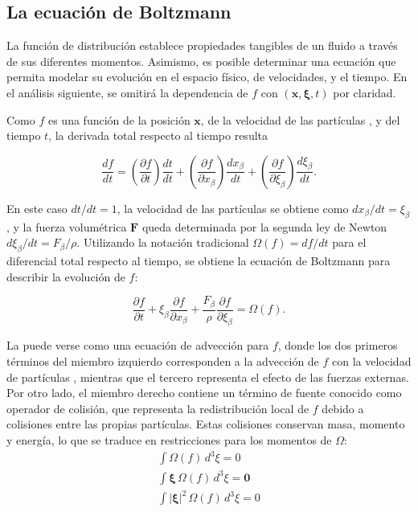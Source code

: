\subsection{La ecuaci\'on de Boltzmann}
La funci\'on de distribuci\'on \fvar{} establece propiedades tangibles de un fluido a trav\'es de sus diferentes momentos. Asimismo, es posible determinar una ecuaci\'on que permita modelar su evoluci\'on en el espacio f\'isico, de velocidades, y el tiempo. En el an\'alisis siguiente, se omitir\'a la dependencia de $f$ con $(\bm{x}, \bm{\xi}, t)$ por claridad.
\par
Como $f$ es una funci\'on de la posici\'on $\bm{x}$, de la velocidad de las part\'iculas \bxi{}, y del tiempo $t$, la derivada total respecto al tiempo resulta

\begin{equation}
	\dfrac{df}{dt} = \left( \dfrac{\partial f}{\partial t} \right) \dfrac{dt}{dt}
	               + \left( \dfrac{\partial f}{\partial x_{\beta}} \right) \dfrac{dx_{\beta}}{dt}
	               + \left( \dfrac{\partial f}{\partial \xi_{\beta}} \right) \dfrac{d\xi_{\beta}}{dt}.
\end{equation}

En este caso $dt/dt = 1$, la velocidad de las part\'iculas se obtiene como $dx_{\beta}/dt = \xi_{\beta}$, y la fuerza volum\'etrica $\bm{F}$ queda determinada por la segunda ley de Newton $d\xi_{\beta}/dt = F_{\beta}/\rho$. Utilizando la notaci\'on tradicional $\Omega (f) = df/dt$ para el diferencial total respecto al tiempo, se obtiene la ecuaci\'on de Boltzmann para describir la evoluci\'on de $f$:

\begin{equation}
	\dfrac{\partial f}{\partial t}  +  \xi_{\beta} \dfrac{\partial f}{\partial x_{\beta}}            +  \dfrac{F_{\beta}}{\rho} \dfrac{\partial f}{\partial \xi_{\beta}} =\Omega(f).
	\label{eq:boltz}
\end{equation}

La  puede verse como una ecuaci\'on de advecci\'on para $f$, donde los dos primeros t\'erminos del miembro izquierdo corresponden a la advecci\'on de $f$ con la velocidad de part\'iculas \bxi{}, mientras que el tercero representa el efecto de las fuerzas externas. Por otro lado, el miembro derecho contiene un t\'ermino de fuente conocido como operador de colisi\'on, que representa la redistribuci\'on local de $f$ debido a colisiones entre las propias part\'iculas. Estas colisiones conservan masa, momento y energ\'ia, lo que se traduce en restricciones para los momentos de $\Omega$:
\begin{subequations}
	\begin{align}
		\int \Omega(f) \, d^3 \xi = 0 \\
		\int \bm{\xi} \, \Omega(f) \, d^3 \xi = \bm{0} \\		
		\int |\bm{\xi}|^2 \, \Omega(f) \, d^3 \xi = 0 	
	\end{align}
	\label{eq:omega_restrict}
\end{subequations}


